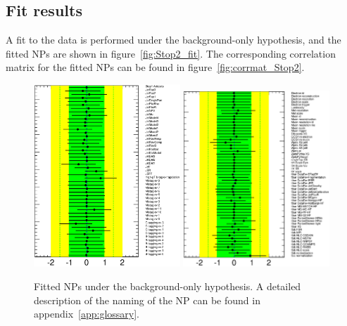 

\subsection{Fit results}
A fit to the data is performed under the background-only hypothesis, and the fitted NPs are shown in figure~\ref{fig:Stop2_fit}.
The corresponding correlation matrix for the
fitted NPs can be found in figure~\ref{fig:corrmat_Stop2}.

\begin{figure}[!tp]
\begin{center}
\includegraphics[trim=0cm 0cm 1.5cm 0cm, clip=true, width=0.49\textwidth]{Analysis/Figures_stop2/detectorUNCtesis_stop2.eps}
\includegraphics[trim=0cm 0cm 1.5cm 0cm, clip=true, width=0.49\textwidth]{Analysis/Figures_stop2/otherUNCtesis_stop2.eps}
\caption{Fitted NPs under the background-only hypothesis. A detailed description of the naming of the NP can be found in appendix~\ref{app:glossary}.}

\end{center}
\end{figure}
